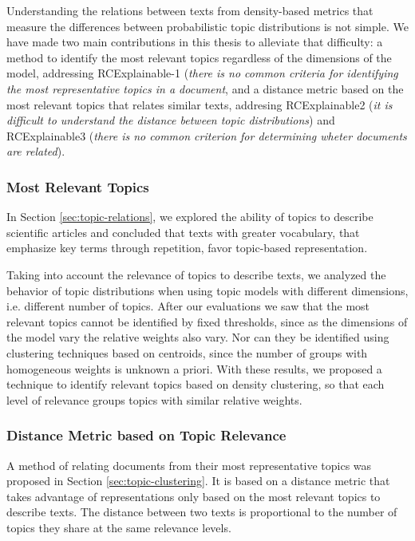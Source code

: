 Understanding the relations between texts from density-based metrics that measure the differences between probabilistic topic distributions is not simple. We have made two main contributions in this thesis to alleviate that difficulty: a method to identify the most relevant topics regardless of the dimensions of the model, addressing RCExplainable-1 (\textit{there is no common criteria for identifying the most representative topics in a document}, and a distance metric based on the most relevant topics that relates similar texts, addresing RCExplainable2 (\textit{it is difficult to understand the distance between topic distributions}) and RCExplainable3 (\textit{there is no common criterion for determining wheter documents are related}).

\subsubsection{Most Relevant Topics}

In Section \ref{sec:topic-relations}, we explored the ability of topics to describe scientific articles and concluded that texts with greater vocabulary, that emphasize key terms through repetition, favor topic-based representation. 

Taking into account the relevance of topics to describe texts, we analyzed the behavior of topic distributions when using topic models with different dimensions, i.e. different number of topics. After our evaluations we saw that the most relevant topics cannot be identified by fixed thresholds, since as the dimensions of the model vary the relative weights also vary. Nor can they be identified using clustering techniques based on centroids, since the number of groups with homogeneous weights is unknown a priori. With these results, we proposed a technique to identify relevant topics based on density clustering, so that each level of relevance groups topics with similar relative weights.

\subsubsection{Distance Metric based on Topic Relevance}

A method of relating documents from their most representative topics was proposed in Section \ref{sec:topic-clustering}. It is based on a distance metric that takes advantage of representations only based on the most relevant topics to describe texts. The distance between two texts is proportional to the number of topics they share at the same relevance levels.

